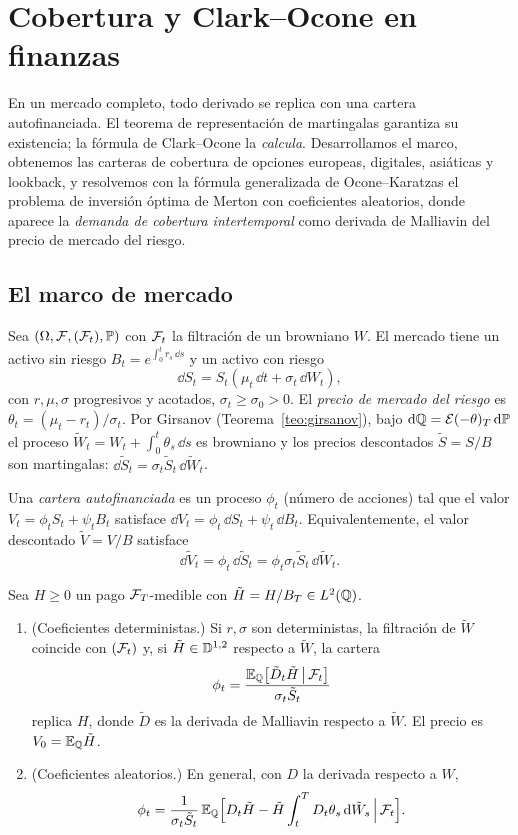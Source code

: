 \chapter{Cobertura y Clark--Ocone en finanzas}\label{cap:cobertura}

\begin{panorama}
En un mercado completo, todo derivado se replica con una cartera autofinanciada. El
teorema de representación de martingalas garantiza su existencia; la fórmula de Clark--Ocone
la \emph{calcula}. Desarrollamos el marco, obtenemos las carteras de cobertura de opciones
europeas, digitales, asiáticas y lookback, y resolvemos con la fórmula generalizada de
Ocone--Karatzas el problema de inversión óptima de Merton con coeficientes aleatorios,
donde aparece la \emph{demanda de cobertura intertemporal} como derivada de Malliavin del
precio de mercado del riesgo.
\end{panorama}

\section{El marco de mercado}
Sea $(\Omega,\mathcal{F},(\mathcal{F}_t),\mathbb{P})$ con $\mathcal{F}_t$ la filtración de un browniano $W$. El mercado tiene un activo sin
riesgo $B_t=e^{\int_0^tr_s\,\dd s}$ y un activo con riesgo
\[
  \dd S_t=S_t(\mu_t\,\dd t+\sigma_t\,\dd W_t),
\]
con $r,\mu,\sigma$ progresivos y acotados, $\sigma_t\ge\sigma_0>0$. El \emph{precio de mercado del riesgo} es $\theta_t=
(\mu_t-r_t)/\sigma_t$. Por Girsanov (Teorema~\ref{teo:girsanov}), bajo $\mathrm{d}\mathbb{Q}=\mathcal E(-\theta)_T\,\mathrm{d}\mathbb{P}$ el proceso $\tilde W_t=W_t+\int_0^t\theta_s\,\dd s$
es browniano y los precios descontados $\tilde S=S/B$ son martingalas: $\dd\tilde S_t=\sigma_t\tilde S_t\,\dd\tilde W_t$.

Una \emph{cartera autofinanciada} es un proceso $\phi_t$ (número de acciones) tal que el valor $V_t=
\phi_tS_t+\psi_tB_t$ satisface $\dd V_t=\phi_t\,\dd S_t+\psi_t\,\dd B_t$. Equivalentemente, el valor descontado $\tilde V=V/B$
satisface
\[
  \dd\tilde V_t=\phi_t\,\dd\tilde S_t=\phi_t\sigma_t\tilde S_t\,\dd\tilde W_t.
\]

\begin{teorema}\label{teo:cobertura}
Sea $H\ge0$ un pago $\mathcal{F}_T$-medible con $\tilde H=
H/B_T\in L^2(\mathbb{Q})$.
\begin{enumerate}[label=(\roman*)]
  \item \textup{(Coeficientes deterministas.)} Si $r,\sigma$ son deterministas, la filtración de $\tilde W$ coincide con
  $(\mathcal{F}_t)$ y, si $\tilde H\in\mathbb{D}^{1,2}$ respecto a $\tilde W$, la cartera
  \[
    \phi_t=\frac{\mathbb{E}_{\mathbb{Q}}\big[\tilde D_t\tilde H\,\big|\,\mathcal{F}_t\big]}{\sigma_t\tilde S_t}
  \]
  replica $H$, donde $\tilde D$ es la derivada de Malliavin respecto a $\tilde W$. El precio es $V_0=\mathbb{E}_{\mathbb{Q}}\tilde H$.
  \item \textup{(Coeficientes aleatorios.)} En general, con $D$ la derivada respecto a $W$,
  \[
    \phi_t=\frac1{\sigma_t\tilde S_t}\,\mathbb{E}_{\mathbb{Q}}\Big[D_t\tilde H-\tilde H\int_t^TD_t\theta_s\,\mathrm{d}\tilde W_s\,\Big|\,\mathcal{F}_t\Big].
  \]
\end{enumerate}
\end{teorema}

